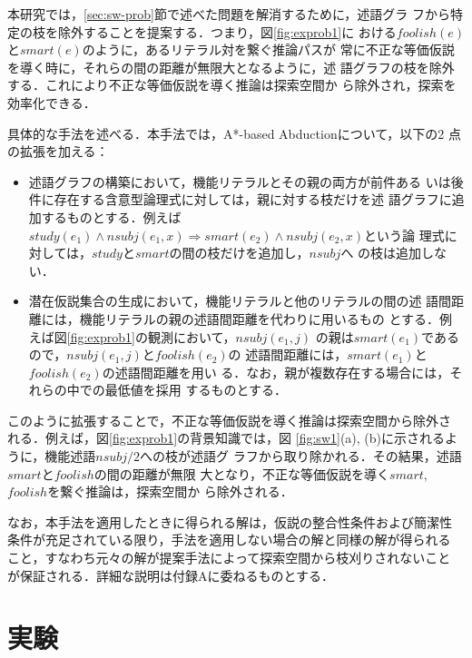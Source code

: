 \documentclass[japanese]{jnlp_1.4}
\begin{document}
本研究では，\ref{sec:sw-prob}節で述べた問題を解消するために，述語グラ
フから特定の枝を除外することを提案する．つまり，図\ref{fig:exprob1}に
おける$\mathit{foolish}(e)$と$\mathit{smart}(e)$のように，あるリテラル対を繋ぐ推論パスが
常に不正な等価仮説を導く時に，それらの間の距離が無限大となるように，述
語グラフの枝を除外する．これにより不正な等価仮説を導く推論は探索空間か
ら除外され，探索を効率化できる．

具体的な手法を述べる．本手法では，A*-based Abductionについて，以下の2
点の拡張を加える：
\begin{itemize}
\item 述語グラフの構築において，機能リテラルとその親の両方が前件ある
	 いは後件に存在する含意型論理式に対しては，親に対する枝だけを述
	 語グラフに追加するものとする．例えば$\mathit{study}(e_1) \land
	 \mathit{nsubj}(e_1,x) \Rightarrow \mathit{smart}(e_2) \land \mathit{nsubj}(e_2,x)$という論
	 理式に対しては，$\mathit{study}$と$\mathit{smart}$の間の枝だけを追加し，$\mathit{nsubj}$へ
	 の枝は追加しない．
\item 潜在仮説集合の生成において，機能リテラルと他のリテラルの間の述
	 語間距離には，機能リテラルの親の述語間距離を代わりに用いるもの
	 とする．例えば図\ref{fig:exprob1}の観測において，$\mathit{nsubj}(e_1,j)$
	 の親は$\mathit{smart}(e_1)$であるので，$\mathit{nsubj}(e_1,j)$と$\mathit{foolish}(e_2)$の
	 述語間距離には，$\mathit{smart}(e_1)$と$\mathit{foolish}(e_2)$の述語間距離を用い
	 る．なお，親が複数存在する場合には，それらの中での最低値を採用
	 するものとする．
\end{itemize}

このように拡張することで，不正な等価仮説を導く推論は探索空間から除外さ
れる．例えば，図\ref{fig:exprob1}の背景知識では，図
\ref{fig:sw1}(a), (b)に示されるように，機能述語$\mathit{nsubj}/2$への枝が述語グ
ラフから取り除かれる．その結果，述語$\mathit{smart}$と$\mathit{foolish}$の間の距離が無限
大となり，不正な等価仮説を導く$\mathit{smart}$, $\mathit{foolish}$を繋ぐ推論は，探索空間か
ら除外される．

なお，本手法を適用したときに得られる解は，仮説の整合性条件および簡潔性
条件が充足されている限り，手法を適用しない場合の解と同様の解が得られる
こと，すなわち元々の解が提案手法によって探索空間から枝刈りされないこと
が保証される．詳細な説明は付録Aに委ねるものとする．




\section{実験}
\end{document}
